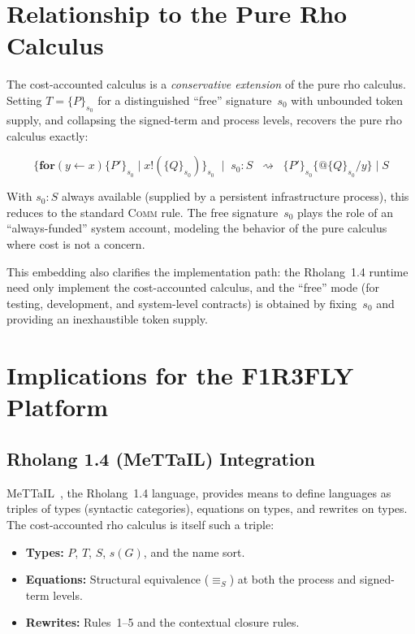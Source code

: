 \documentclass[11pt,a4paper]{article}
\makeatletter
\newcommand{\Par}{\mathbin{|}}
\newcommand{\forc}{\mathbf{for}}
\newcommand{\send}[2]{#1 !\!\left( #2 \right)}
\newcommand{\recv}[3]{\forc\!\left( #1 \leftarrow #2 \right) #3}
\newcommand{\quot}[1]{@#1}
\newcommand{\signed}[2]{\{#1\}_{#2}}
\newcommand{\Seq}{\equiv_{\!S}}
\newcommand{\red}{\rightsquigarrow}
\makeatother
\begin{document}
\section{Relationship to the Pure Rho Calculus}
\label{sec:relationship}

The cost-accounted calculus is a \emph{conservative extension}
of the pure rho calculus.  Setting $T = \signed{P}{s_0}$ for a
distinguished ``free'' signature~$s_0$ with unbounded token
supply, and collapsing the signed-term and process levels,
recovers the pure rho calculus exactly:

\[
  \signed{\recv{y}{x}{\signed{P'}{s_0}} \Par
    \send{x}{\signed{Q}{s_0}}}{s_0}
  \;\Par\; s_0 : S
  \;\;\red\;\;
  \signed{P'}{s_0}\{\quot{\signed{Q}{s_0}}/y\} \Par S
\]

\noindent
With $s_0 : S$ always available (supplied by a persistent
infrastructure process), this reduces to the standard
\textsc{Comm} rule.  The free signature~$s_0$ plays the role of
an ``always-funded'' system account, modeling the behavior of
the pure calculus where cost is not a concern.

This embedding also clarifies the implementation path: the
Rholang~1.4 runtime need only implement the cost-accounted
calculus, and the ``free'' mode (for testing, development, and
system-level contracts) is obtained by fixing~$s_0$ and
providing an inexhaustible token supply.

\section{Implications for the F1R3FLY Platform}
\label{sec:implications}

\subsection{Rholang 1.4 (MeTTaIL) Integration}

MeTTaIL~\cite{MeTTaIL}, the Rholang~1.4 language, provides
means to define languages as triples of types (syntactic
categories), equations on types, and rewrites on types.  The
cost-accounted rho calculus is itself such a triple:

\begin{itemize}[nosep]
  \item \textbf{Types:}  $P$, $T$, $S$, $s(G)$, and the name
    sort.
  \item \textbf{Equations:}  Structural equivalence ($\Seq$)
    at both the process and signed-term levels.
  \item \textbf{Rewrites:}  Rules~1--5 and the contextual
    closure rules.
\end{itemize}
\end{document}
